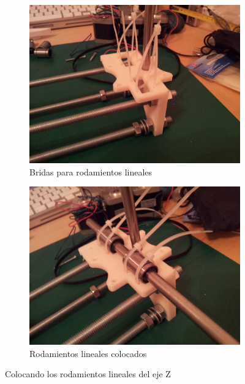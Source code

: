 		\begin{figure}[H]
		        \centering
		        \begin{subfigure}[htb]{0.5\textwidth}
		                \centering
		                \includegraphics[width=\textwidth]{../../Fotos/76.jpg}
		                \caption{Bridas para rodamientos lineales}
		                \label{fig:5.z}
		        \end{subfigure}
		        \begin{subfigure}[htb]{0.5\textwidth}
		                \centering
		                \includegraphics[width=\textwidth]{../../Fotos/77.jpg}
		                \caption{Rodamientos lineales colocados}
		                \label{fig:6.z}
		        \end{subfigure}
		        \caption{Colocando los rodamientos lineales del eje Z}\label{fig:7.z}
		\end{figure}
